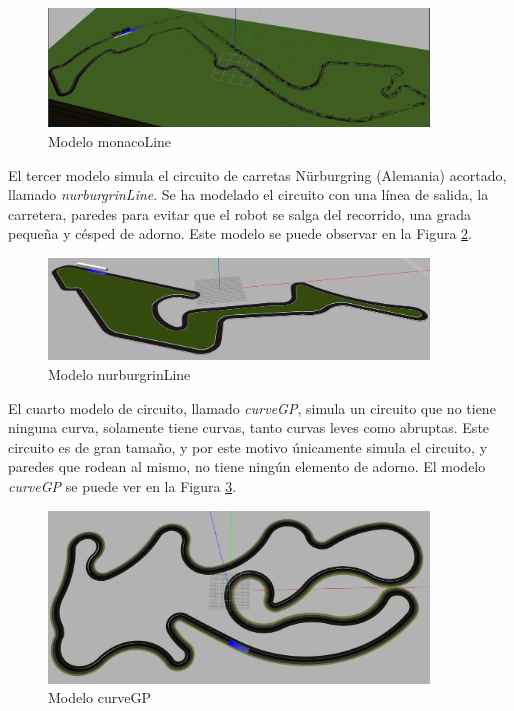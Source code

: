 \begin{figure}[H]
  \begin{center}
    \includegraphics[width=0.9\textwidth]{figures/Infraestructura/circuit_Monaco.png}
		\caption{Modelo monacoLine}
		\label{fig.monaco}
		\end{center}
\end{figure}

El tercer modelo simula el circuito de carretas Nürburgring (Alemania) acortado, llamado \textit{nurburgrinLine}. Se ha modelado el circuito con una línea de salida, la carretera, paredes para evitar que el robot se salga del recorrido, una grada pequeña y césped de adorno. Este modelo se puede observar en la Figura \ref{fig.nurburgrin}.\\

\begin{figure}[H]
  \begin{center}
    \includegraphics[width=0.9\textwidth]{figures/Infraestructura/circuit_Nurburgrin.png}
		\caption{Modelo nurburgrinLine}
		\label{fig.nurburgrin}
		\end{center}
\end{figure}

El cuarto modelo de circuito, llamado \textit{curveGP}, simula un circuito que no tiene ninguna curva, solamente tiene curvas, tanto curvas leves como abruptas. Este circuito es de gran tamaño, y por este motivo únicamente simula el circuito, y paredes que rodean al mismo, no tiene ningún elemento de adorno. El modelo \textit{curveGP} se puede ver en la Figura \ref{fig.curveGP}.\\


\begin{figure}[H]
  \begin{center}
    \includegraphics[width=0.9\textwidth]{figures/Infraestructura/circuit_CurveGP.png}
		\caption{Modelo curveGP}
		\label{fig.curveGP}
		\end{center}
\end{figure}


